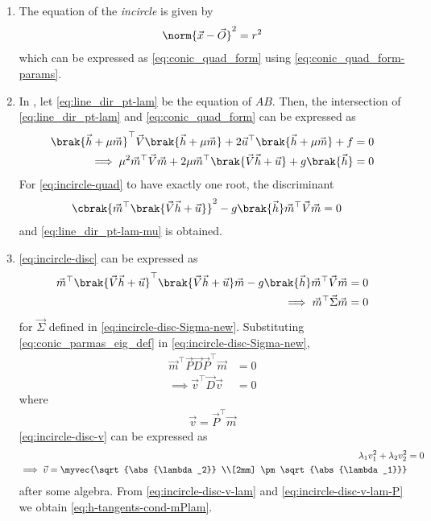\begin{enumerate}[label=\thesubsection.\arabic*,ref=\thesubsection.\theenumi]
	\item The equation of the {\em incircle} is given by 
		\begin{align}
			\label{eq:incircle}
			\norm{\vec{x}-\vec{O}}^2 = r^2
		\end{align}
		which can be expressed as 
			 \eqref{eq:conic_quad_form}
			 using 
			 \eqref{eq:conic_quad_form-params}.
		 \item 	In , 
let 
  \eqref{eq:line_dir_pt-lam}
  be the equation of $AB$.  Then, the intersection of 
  \eqref{eq:line_dir_pt-lam}
  and 
			 \eqref{eq:conic_quad_form}
			 can be expressed as 
\begin{align}
\brak{\vec{h} + \mu{\vec{m}}}^{\top}
\vec{V}
\brak{\vec{h} + \mu{\vec{m}}}
			+2\vec{u}^{\top}\brak{\vec{h} + \mu{\vec{m}}}+f &= 0
			\\
\implies \mu^2\vec{m}^{\top} \vec{V}\vec{m} + 2\mu \vec{m}^{\top}\brak{\vec{V}\vec{h}+\vec{u}}+g\brak{\vec{h}} &= 0 
	\label{eq:incircle-quad}
\end{align}
For 	\eqref{eq:incircle-quad} to have exactly one root, the discriminant
\begin{align}
 \cbrak{\vec{m}^{\top}\brak{\vec{V}\vec{h}+\vec{u}}}^2 -g\brak{\vec{h}}\vec{m}^{\top} \vec{V}\vec{m}  &= 0 
	\label{eq:incircle-disc}
\end{align}
and 
  \eqref{eq:line_dir_pt-lam-mu}
  is obtained.
  \item 
	\eqref{eq:incircle-disc}
	can be expressed as
\begin{align}
\vec{m}^{\top}\brak{\vec{V}\vec{h}+\vec{u}}^{\top}\brak{\vec{V}\vec{h}+\vec{u}}\vec{m}-g\brak{\vec{h}}\vec{m}^{\top} \vec{V}\vec{m}  &= 0 
\\
\implies \vec{m}^{\top}\vec{\Sigma}\vec{m} &= 0
	\label{eq:incircle-disc-Sigma-new}
\end{align}
for $\vec{\Sigma}$ defined in 
	\eqref{eq:incircle-disc-Sigma-new}.
      Substituting \eqref{eq:conic_parmas_eig_def}
	in \eqref{eq:incircle-disc-Sigma-new},
\begin{align}
\vec{m}^{\top}\vec{P}\vec{D}\vec{P}^{\top}\vec{m} &= 0
\\
\implies 
\vec{v}^{\top}\vec{D}\vec{v} &= 0
	\label{eq:incircle-disc-v}
\end{align}
where 
\begin{align}
	\label{eq:incircle-disc-v-lam-P}
\vec{v} = \vec{P}^{\top}\vec{m}
\end{align}
	\eqref{eq:incircle-disc-v}
	can be expressed as 
\begin{align}
\lambda_1 v_1^2
+\lambda_2 v_2^2 &= 0
\\
\implies \vec{v} = \myvec{\sqrt{\abs{\lambda_2}} \\[2mm]  \pm \sqrt{\abs{\lambda_1}}}
	\label{eq:incircle-disc-v-lam}
\end{align}
after some algebra.
From 
	\eqref{eq:incircle-disc-v-lam}
	and
	\eqref{eq:incircle-disc-v-lam-P}
	we obtain 
	  \eqref{eq:h-tangents-cond-mPlam}.
	  \end{enumerate}
